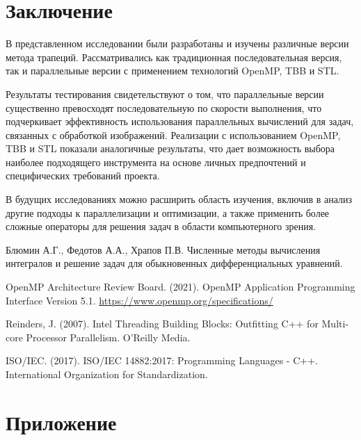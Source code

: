 \documentclass[]{article}
\theoremstyle{remark}
\theoremstyle{definition}
\begin{document}
\newpage

\section{Заключение}

\par В представленном исследовании были разработаны и изучены различные версии метода трапеций. Рассматривались как традиционная последовательная версия, так и параллельные версии с применением технологий OpenMP, TBB и STL.

\par Результаты тестирования свидетельствуют о том, что параллельные версии существенно превосходят последовательную по скорости выполнения, что подчеркивает эффективность использования параллельных вычислений для задач, связанных с обработкой изображений. Реализации с использованием OpenMP, TBB и STL показали аналогичные результаты, что дает возможность выбора наиболее подходящего инструмента на основе личных предпочтений и специфических требований проекта.

\par В будущих исследованиях можно расширить область изучения, включив в анализ другие подходы к параллелизации и оптимизации, а также применить более сложные операторы для решения задач в области компьютерного зрения.

\begin{thebibliography}{9}

Блюмин А.Г., Федотов А.А., Храпов П.В. Численные методы вычисления интегралов и решение задач для обыкновенных дифференциальных уравнений.

OpenMP Architecture Review Board. (2021). OpenMP Application Programming Interface Version 5.1. \url{https://www.openmp.org/specifications/}

Reinders, J. (2007). Intel Threading Building Blocks: Outfitting C++ for Multi-core Processor Parallelism. O'Reilly Media.

ISO/IEC. (2017). ISO/IEC 14882:2017: Programming Languages - C++. International Organization for Standardization.

\end{thebibliography}

\newpage

\section{Приложение}
\end{document}
